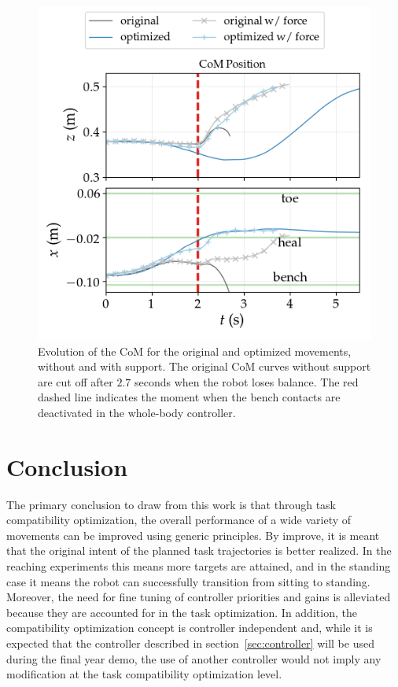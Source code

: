 \documentclass[12pt,a4paper,twoside]{article}
\begin{document}
\begin{figure}[!h]
	\begin{minipage}[c]{0.6\textwidth}
	\centering
   \includegraphics[width=1\textwidth, trim={0cm 0.5cm 0cm 0cm}, clip]{with_forces/standing_trajectories}
  	\end{minipage}\hfill
  \begin{minipage}[c]{0.37\textwidth}
	\setlength{\belowcaptionskip}{-10pt}
    \caption{Evolution of the CoM for the original and optimized movements, without and with support. The original CoM curves without support are cut off after $2.7$ seconds when the robot loses balance. The red dashed line indicates the moment when the bench contacts are deactivated in the whole-body controller.}
    \label{fig:standing_traj_with_forces}
  \end{minipage}
\end{figure}

\section{Conclusion}
    The primary conclusion to draw from this work is that through task compatibility optimization,  the overall performance of a wide variety of movements can be improved using  generic principles. By improve, it is meant that the original intent of the planned task trajectories is better realized. In the reaching experiments this means more targets are attained, and in the standing case it means the robot can successfully transition from sitting to standing. Moreover, the need for fine tuning of controller priorities and gains is alleviated because they are accounted for in the task optimization. In addition, the compatibility optimization concept is controller independent and, while it is expected that the controller described in section~\ref{sec:controller} will be used during the final year demo, the use of another controller would not imply any modification at the task compatibility optimization level.\\
    
\end{document}
